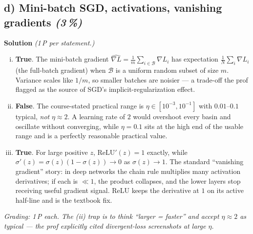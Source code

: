 \documentclass[11pt,a4paper]{article}
\newcommand{\subpoints}[1]{\textit{(#1\,\%)}}
\newcommand{\sol}{\noindent\textbf{Solution}}
\begin{document}
\subsection*{d) Mini-batch SGD, activations, vanishing gradients \subpoints{3}}
\sol{} \emph{(1\,P per statement.)}
\begin{enumerate}[(i)]
  \item \textbf{True}. The mini-batch gradient
        $\widehat{\nabla L} = \tfrac{1}{m}\sum_{i\in\mathcal B}\nabla L_i$ has expectation
        $\tfrac{1}{N}\sum_i \nabla L_i$ (the full-batch gradient) when $\mathcal B$ is a uniform
        random subset of size $m$. Variance scales like $1/m$, so smaller batches are noisier --- a
        trade-off the prof flagged as the source of SGD's implicit-regularization effect.
  \item \textbf{False}. The course-stated practical range is $\eta \in [10^{-3}, 10^{-1}]$ with
        $0.01$--$0.1$ typical, \emph{not} $\eta \approx 2$. A learning rate of $2$ would overshoot
        every basin and oscillate without converging, while $\eta = 0.1$ sits at the high end of the
        usable range and is a perfectly reasonable practical value.
  \item \textbf{True}. For large positive $z$, $\mathrm{ReLU}'(z) = 1$ exactly, while
        $\sigma'(z) = \sigma(z)(1-\sigma(z)) \to 0$ as $\sigma(z) \to 1$. The standard ``vanishing
        gradient'' story: in deep networks the chain rule multiplies many activation derivatives;
        if each is $\ll 1$, the product collapses, and the lower layers stop receiving useful
        gradient signal. ReLU keeps the derivative at $1$ on its active half-line and is the
        textbook fix.
\end{enumerate}

\noindent\emph{Grading: 1\,P each. The (ii) trap is to think ``larger = faster'' and accept $\eta \approx 2$
as typical --- the prof explicitly cited divergent-loss screenshots at large $\eta$.}
\end{document}

